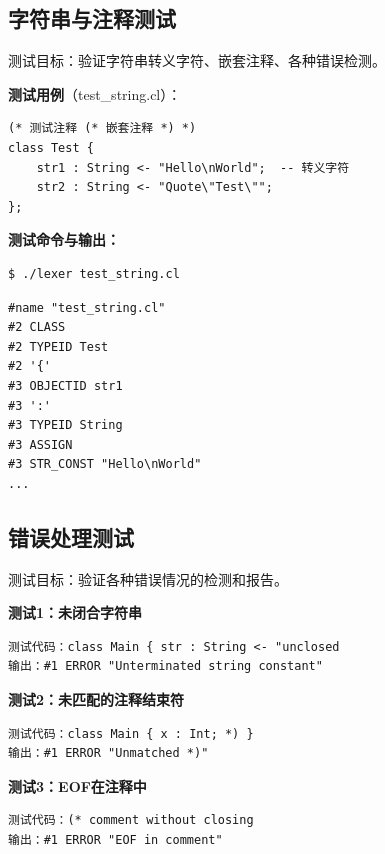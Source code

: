 \documentclass[twocolumn]{article}
\begin{document}
\subsection{字符串与注释测试}

测试目标：验证字符串转义字符、嵌套注释、各种错误检测。

\textcolor{red}{%
}

\textbf{测试用例}（test\_string.cl）：
\begin{lstlisting}[language=cool, caption={字符串测试}]
(* 测试注释 (* 嵌套注释 *) *)
class Test {
    str1 : String <- "Hello\nWorld";  -- 转义字符
    str2 : String <- "Quote\"Test\"";
};
\end{lstlisting}

\textbf{测试命令与输出：}
\begin{verbatim}
$ ./lexer test_string.cl
\end{verbatim}

\textcolor{red}{%
}
\begin{verbatim}
#name "test_string.cl"
#2 CLASS
#2 TYPEID Test
#2 '{'
#3 OBJECTID str1
#3 ':'
#3 TYPEID String
#3 ASSIGN
#3 STR_CONST "Hello\nWorld"
...
\end{verbatim}

\subsection{错误处理测试}

测试目标：验证各种错误情况的检测和报告。

\textcolor{red}{%
}

\textbf{测试1：未闭合字符串}
\begin{verbatim}
测试代码：class Main { str : String <- "unclosed
输出：#1 ERROR "Unterminated string constant"
\end{verbatim}

\textbf{测试2：未匹配的注释结束符}
\begin{verbatim}
测试代码：class Main { x : Int; *) }
输出：#1 ERROR "Unmatched *)"
\end{verbatim}

\textbf{测试3：EOF在注释中}
\begin{verbatim}
测试代码：(* comment without closing
输出：#1 ERROR "EOF in comment"
\end{verbatim}
\end{document}
